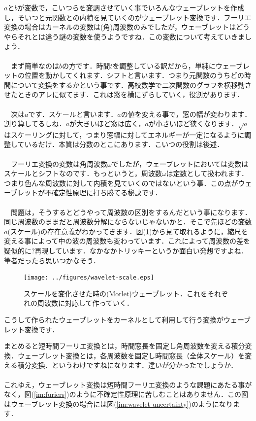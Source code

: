 \documentclass[11pt,a4paper]{ujreport} 	%
\begin{document}
$a$と$b$が変数で，こいつらを変調させていく事でいろんなウェーブレットを作成し，そいつと元関数との内積を見ていくのがウェーブレット変換です．フーリエ変換の場合はカーネルの変数は(角)周波数のみでしたが，ウェーブレットはどうやらそれとは違う謎の変数を使うようですね．この変数について考えていきましょう．\\
\\
　まず簡単なのは$b$の方です．時間$t$を調整している訳だから，単純にウェーブレットの位置を動かしてくれます．シフトと言います．つまり元関数のうちどの時間について変換をするかという事です．高校数学で二次関数のグラフを横移動させたときのアレに似てます．これは窓を横にずらしていく，役割があります．\\
\\
　次は$a$です．スケールと言います．$a$の値を変える事で，窓の幅が変わります．割り算してるしね．$a$が大きいほど窓は広く，$a$が小さいほど狭くなります．$\sqrt{a}$はスケーリングに対して，つまり窓幅に対してエネルギーが一定になるように調整しているだけ．本質は分数のとこにあります．こいつの役割は後述．\\
\\
　フーリエ変換の変数は角周波数$\omega$でしたが，ウェーブレットにおいては変数はスケールとシフトなのです．もっというと，周波数$\omega$は定数として扱われます．つまり色んな周波数に対して内積を見ていくのではないという事．この点がウェーブレットが不確定性原理に打ち勝てる秘訣です．\\
\\
　問題は，そうするとどうやって周波数の区別をするんだという事になります．同じ周波数のままだと周波数分解にならないじゃないかと．そこで先ほどの変数$a$(スケール)の存在意義がわかってきます．図(\ref{im:scale})から見て取れるように，縮尺を変える事によって中の波の周波数も変わっています．これによって周波数の差を疑似的に?再現しています．なかなかトリッキーというか面白い発想ですよね．筆者だったら思いつかなそう．

\begin{figure}[H]
  \label{im:scale}
  \centering
  \texttt{[image: ../figures/wavelet-scale.eps]}
  \caption{スケールを変化させた時の(Morlet)ウェーブレット．これをそれぞれの周波数に対応して作っていく．}
\end{figure}

こうして作られたウェーブレットをカーネルとして利用して行う変換がウェーブレット変換です．

まとめると短時間フーリエ変換とは，時間窓長を固定し角周波数を変える積分変換．ウェーブレット変換とは，各周波数を固定し時間窓長（全体スケール）を変える積分変換．というわけですねになります．違いが分かったでしょうか．\\
\\
これゆえ，ウェーブレット変換は短時間フーリエ変換のような課題にあたる事がなく，図(\ref{im:furiers})のように不確定性原理に苦しむことはありません．この図はウェーブレット変換の場合には図(\ref{im:wavelet-uncertainty})のようになります．
\end{document}
